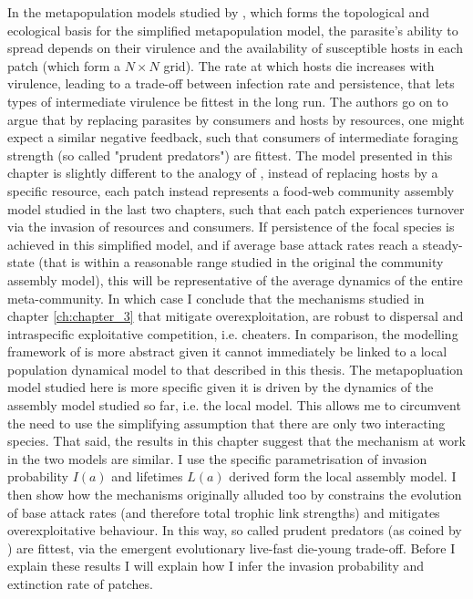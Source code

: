 \documentclass[a4paper]{report}
\begin{document}
{In the metapopulation models studied by \citep{Goodnight2008}, which forms the topological and ecological basis for the simplified metapopulation model, the parasite's ability to spread depends on their virulence and the availability of susceptible hosts in each patch (which form a $N \times N$ grid). The rate at which hosts die increases with virulence, leading to a trade-off between infection rate and persistence, that lets types of intermediate virulence be fittest in the long run. The authors go on to argue that by replacing parasites by consumers and hosts by resources, one might expect a similar negative feedback, such that consumers of intermediate foraging strength (so called "prudent predators") are fittest. The model presented in this chapter is slightly different to the analogy of \citep{Goodnight2008}, instead of replacing hosts by a specific resource, each patch instead represents a food-web community assembly model studied in the last two chapters, such that each patch experiences turnover via the invasion of resources and consumers. If persistence of the focal species is achieved in this simplified model, and if average base attack rates reach a steady-state (that is within a reasonable range studied in the original the community assembly model), this will be representative of the average dynamics of the entire meta-community. In which case I conclude that the  mechanisms studied in chapter \ref{ch:chapter_3} that mitigate overexploitation, are robust to dispersal and intraspecific exploitative competition, i.e. cheaters. In comparison, the modelling framework of \citep{Goodnight2008} is more abstract given it cannot immediately be linked to a local population dynamical model to that described in this thesis. The metapopluation model studied here is more specific given it is driven by the dynamics of the assembly model studied so far, i.e. the local model. This allows me to circumvent the need to use the simplifying assumption that there are only two interacting species. That said, the results in this chapter suggest that the mechanism at work in the two models are similar. I use the specific parametrisation of invasion probability $I(a)$ and lifetimes $L(a)$ derived form the local assembly model. I then show how the mechanisms originally alluded too by \citep{Goodnight2008} constrains the evolution of base attack rates (and therefore total trophic link strengths) and mitigates overexploitative behaviour. In this way, so called prudent predators (as coined by \citep{Slobodkin1968}) are fittest, via the emergent evolutionary  live-fast die-young trade-off. Before I explain these results I will explain how I infer the invasion probability and extinction rate of patches. 
 
}
\end{document}
